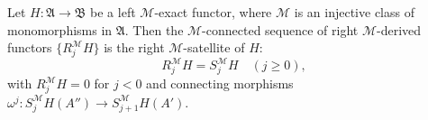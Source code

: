 Let $H : \mathfrak{A} \rightarrow \mathfrak{B}$ be a left $\mathcal{M}$-exact functor, where $\mathcal{M}$ is an injective class of monomorphisms in $\mathfrak{A}$. Then the $\mathcal{M}$-connected sequence of right $\mathcal{M}$-derived functors $\{R^{\mathcal{M}}_j H\}$ is the right $\mathcal{M}$-satellite of $H$:
$$R_j^{\mathcal{M}} H = S^{\mathcal{M}}_j H \quad (j \geq 0),$$
with $R_j^{\mathcal{M}} H = 0$ for $j < 0$ and connecting morphisms $\omega^j : S^{\mathcal{M}}_j H(A'') \to S^{\mathcal{M}}_{j+1} H(A')$.
